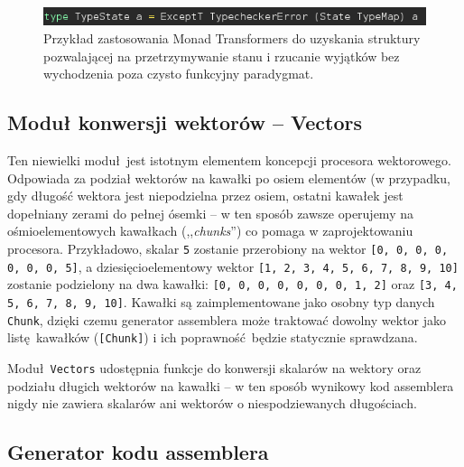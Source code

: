 \begin{figure}
  \begin{center}
    \includegraphics[scale=0.5]{images/type-state.png}
    \caption{Przykład zastosowania Monad Transformers do uzyskania struktury pozwalającej na przetrzymywanie stanu i rzucanie wyjątków bez wychodzenia poza czysto funkcyjny paradygmat.}
    \label{fig:type-state}
  \end{center}
\end{figure}

\subsection{Moduł konwersji wektorów -- Vectors}

Ten niewielki moduł jest istotnym elementem koncepcji procesora wektorowego. Odpowiada za podział wektorów na kawałki po osiem elementów (w przypadku, gdy długość wektora jest niepodzielna przez osiem, ostatni kawałek jest dopełniany zerami do pełnej ósemki -- w ten sposób zawsze operujemy na ośmioelementowych kawałkach (,,\textit{chunks}'') co pomaga w zaprojektowaniu procesora. Przykładowo, skalar \texttt{5} zostanie przerobiony na wektor \texttt{[0, 0, 0, 0, 0, 0, 0, 5]}, a dziesięcioelementowy wektor \texttt{[1, 2, 3, 4, 5, 6, 7, 8, 9, 10]} zostanie podzielony na dwa kawałki: \texttt{[0, 0, 0, 0, 0, 0, 0, 1, 2]} oraz \texttt{[3, 4, 5, 6, 7, 8, 9, 10]}. Kawałki są zaimplementowane jako osobny typ danych \texttt{Chunk}, dzięki czemu generator assemblera może traktować dowolny wektor jako listę kawałków (\texttt{[Chunk]}) i ich poprawność będzie statycznie sprawdzana.

Moduł \texttt{Vectors} udostępnia funkcje do konwersji skalarów na wektory oraz podziału długich wektorów na kawałki -- w ten sposób wynikowy kod assemblera nigdy nie zawiera skalarów ani wektorów o niespodziewanych długościach.


\subsection{Generator kodu assemblera}

